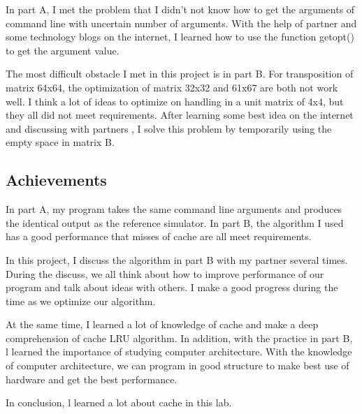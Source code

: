 \documentclass{article}
\begin{document}
In part A, I met the problem that I didn't not know how to get the arguments of command line with uncertain number of arguments. With the help of partner and some technology blogs on the internet, I learned how to use the function getopt() to get the argument value.

The most difficult obstacle I met in this project is in part B. For transposition of matrix 64x64, the optimization of matrix 32x32 and 61x67 are both not work well. I think a lot of ideas to optimize on handling in a unit matrix of 4x4, but they all did not meet requirements. After learning some best idea on the internet and discussing with partners , I solve this problem by temporarily using the empty space in matrix B.

\subsection{Achievements}

In part A, my program takes the same command line arguments and produces the identical output as the reference simulator. In part B, the algorithm I used has a good performance that misses of cache are all meet requirements.

In this project, I discuss the algorithm in part B with my partner several times. During the discuss, we all think about how to improve  performance of our program and talk about ideas with others. I make a good progress during the time as we optimize our algorithm.

At the same time, I learned a lot of knowledge of cache and make a deep comprehension of cache LRU algorithm. In addition, with the practice in part B, l learned the importance of studying computer architecture. With the knowledge of computer architecture, we can program in good structure to make best use of hardware and get the best performance.

In conclusion, l learned a lot about cache in this lab.






\end{document}
